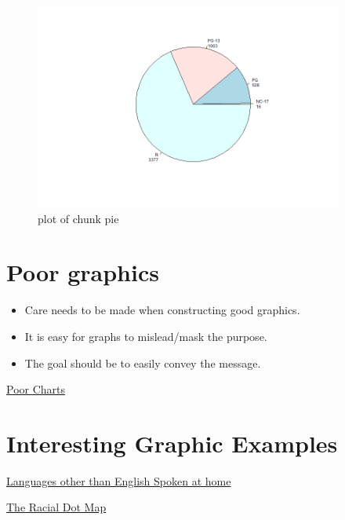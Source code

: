 \documentclass[12pt]{article}
\begin{document}
\begin{figure}[H]
\centering
\includegraphics[width=4in]{figure/pie-1.png}
\caption{plot of chunk pie}
\end{figure}

\section{Poor graphics}\label{poor-graphics}

\begin{itemize}
\itemsep1pt\parskip0pt
\item
  Care needs to be made when constructing good graphics.
\item
  It is easy for graphs to mislead/mask the purpose.
\item
  The goal should be to easily convey the message.
\end{itemize}

\href{http://flowingdata.com/2013/07/15/open-thread-what-is-wrong-with-these-charts/}{Poor
Charts}

\section{Interesting Graphic
Examples}\label{interesting-graphic-examples}

\href{http://www.washingtonpost.com/wp-srv/special/national/us-language-map/}{Languages
other than English Spoken at home}

\href{http://www.coopercenter.org/demographics/Racial-Dot-Map}{The
Racial Dot Map}
\end{document}
